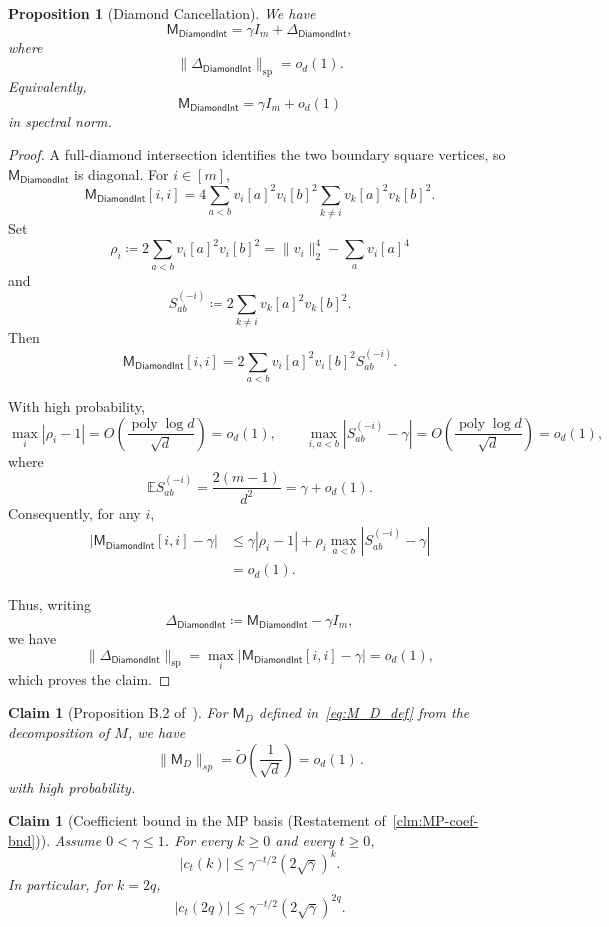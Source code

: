 \documentclass[12pt]{article}
\def \E {\mathbb{E}}
\newtheorem{claim}[theorem]{Claim}
\newtheorem{proposition}[theorem]{Proposition}
\newcommand{\poly}{\operatorname{poly}}
\newcommand{\cm}{\mathsf{M} }
\begin{document}
\begin{proposition}[Diamond Cancellation]
We have
\[
    \cm_{\mathsf{DiamondInt}}
    =
    \gamma I_m
    +
    \Delta_{\mathsf{DiamondInt}},
\]
where
\[
    \|\Delta_{\mathsf{DiamondInt}}\|_{\mathrm{sp}}
    =
    o_d(1).
\]
Equivalently,
\[
    \cm_{\mathsf{DiamondInt}}
    =
    \gamma I_m
    +
    o_d(1)
\]
in spectral norm.
\end{proposition}

\begin{proof}
A full-diamond intersection identifies the two boundary square vertices,
so \(\cm_{\mathsf{DiamondInt}}\) is diagonal. For \(i\in[m]\),
\[
\cm_{\mathsf{DiamondInt}}[i,i]
=
4\sum_{a<b}
v_i[a]^2v_i[b]^2
\sum_{k\neq i}v_k[a]^2v_k[b]^2.
\]
Set
\[
\rho_i
\coloneqq
2\sum_{a<b}v_i[a]^2v_i[b]^2
=
\|v_i\|_2^4-\sum_a v_i[a]^4
\]
and
\[
S_{ab}^{(-i)}
\coloneqq
2\sum_{k\neq i}v_k[a]^2v_k[b]^2.
\]
Then
\[
\cm_{\mathsf{DiamondInt}}[i,i]
=
2\sum_{a<b}v_i[a]^2v_i[b]^2S_{ab}^{(-i)}.
\]

With high probability,
\[
\max_i|\rho_i-1|=O(\frac{\poly\log d}{\sqrt{d}})= o_d(1),
\qquad
\max_{i,a<b}|S_{ab}^{(-i)}-\gamma|=O(\frac{\poly\log d}{\sqrt{d}})= o_d(1),
\]
where
\[
\E S_{ab}^{(-i)}
=
\frac{2(m-1)}{d^2}
=
\gamma+o_d(1).
\]
Consequently, for any \(i\),
\begin{align*}
\left|
\cm_{\mathsf{DiamondInt}}[i,i]-\gamma
\right|
&\leq
\gamma|\rho_i-1|
+
\rho_i\max_{a<b}|S_{ab}^{(-i)}-\gamma|  \\
&=o_d(1).
\end{align*}

Thus, writing
\[
\Delta_{\mathsf{DiamondInt}}
\coloneqq
\cm_{\mathsf{DiamondInt}}-\gamma I_m,
\]
we have
\[
\|\Delta_{\mathsf{DiamondInt}}\|_{\mathrm{sp}}
=
\max_i
\left|
\cm_{\mathsf{DiamondInt}}[i,i]-\gamma
\right|
=
o_d(1),
\]
which proves the claim.
\end{proof}

\begin{claim}[Proposition B.2 of~\cite{HKPX23}]
For $\cm_D$ defined in~\cref{eq:M_D_def} from the decomposition of $M$, we have
	\[ 
	\|\cm_D\|_{sp} =\tilde{O}(\frac{1}{\sqrt{d}} )= o_d(1)\,.
	\]
	with high probability.
\end{claim}

 \begin{claim}[Coefficient bound in the MP basis (Restatement of~\cref{clm:MP-coef-bnd})]
  Assume \(0<\gamma\le1\). For every \(k\ge0\) and every \(t\ge0\), \[ |c_t(k)| \le \gamma^{-t/2}(2\sqrt{\gamma})^k. \] 
 In particular, for \(k=2q\), \[ |c_t(2q)| \le \gamma^{-t/2}(2\sqrt{\gamma})^{2q}. \] \end{claim} 
\end{document}
